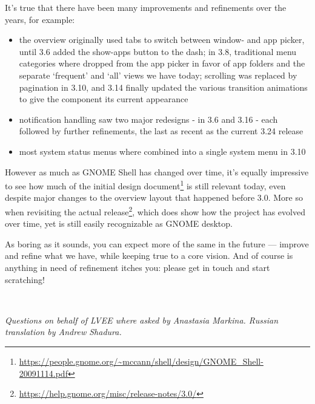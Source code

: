 \documentclass[10pt, a5paper]{article}
\begin{document}
\begin{Parallel}[p]{}{}
{\a It's true that there have been many improvements and refinements over the years, for example:
\begin{itemize}
\item the overview originally used tabs to switch between window- and
   app picker, until 3.6 added the show-apps button to the dash; in
   3.8, traditional menu categories where dropped from the app picker
   in favor of app folders and the separate ‘frequent’ and ‘all’ views
   we have today; scrolling was replaced by pagination in 3.10, and 3.14
   finally updated the various transition animations to give the component
   its current appearance

\item notification handling saw two major redesigns - in 3.6 and 3.16 - each
   followed by further refinements, the last as recent as the current 3.24
   release

\item most system status menus where combined into a single system menu in 3.10
\end{itemize}

However as much as GNOME Shell has changed over time, it's equally impressive to see how much of the initial design document\footnote{\url{https://people.gnome.org/~mccann/shell/design/GNOME\_Shell-20091114.pdf}} is still relevant today, even despite major changes to the overview layout that happened before 3.0. More so when revisiting the actual release\footnote{\url{https://help.gnome.org/misc/release-notes/3.0/}}, which does show how the project has evolved over time, yet is still easily recognizable as GNOME desktop.

As boring as it sounds, you can expect more of the same in the future --- improve and refine what we have, while keeping true to a core vision. And of course is anything in need of refinement itches you: please get in touch and start scratching!

~

\noindent \emph{Questions on behalf of LVEE where asked by Anastasia Markina. \linebreak Russian translation by Andrew Shadura.}

\vfill
     }
\end{Parallel}
\end{document}
